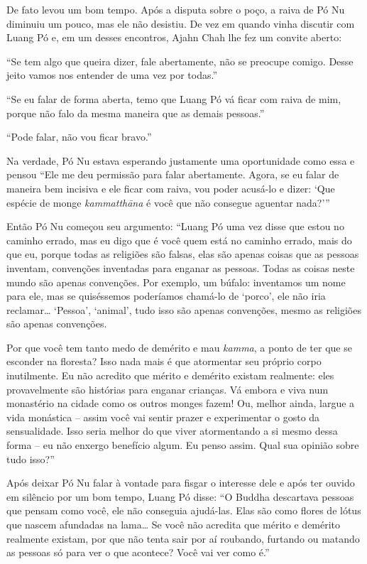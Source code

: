 De fato levou um bom tempo. Após a disputa sobre o poço, a raiva de Pó
Nu diminuiu um pouco, mas ele não desistiu. De vez em quando vinha
discutir com Luang Pó e, em um desses encontros, Ajahn Chah lhe fez um
convite aberto:

``Se tem algo que queira dizer, fale abertamente, não se preocupe
comigo. Desse jeito vamos nos entender de uma vez por todas.''

``Se eu falar de forma aberta, temo que Luang Pó vá ficar com raiva de
mim, porque não falo da mesma maneira que as demais pessoas.''

``Pode falar, não vou ficar bravo.''

Na verdade, Pó Nu estava esperando justamente uma oportunidade como essa
e pensou ``Ele me deu permissão para falar abertamente. Agora, se eu
falar de maneira bem incisiva e ele ficar com raiva, vou poder acusá-lo
e dizer: `Que espécie de monge \emph{kammatthāna} é você que não
consegue aguentar nada?'''

Então Pó Nu começou seu argumento: ``Luang Pó uma vez disse que estou no
caminho errado, mas eu digo que é você quem está no caminho errado, mais
do que eu, porque todas as religiões são falsas, elas são apenas coisas
que as pessoas inventam, convenções inventadas para enganar as pessoas.
Todas as coisas neste mundo são apenas convenções. Por exemplo, um
búfalo: inventamos um nome para ele, mas se quiséssemos poderíamos
chamá-lo de `porco', ele não iria reclamar\ldots{} `Pessoa', `animal',
tudo isso são apenas convenções, mesmo as religiões são apenas
convenções.

Por que você tem tanto medo de demérito e mau \emph{kamma}, a ponto de
ter que se esconder na floresta? Isso nada mais é que atormentar seu
próprio corpo inutilmente. Eu não acredito que mérito e demérito existam
realmente: eles provavelmente são histórias para enganar crianças. Vá
embora e viva num monastério na cidade como os outros monges fazem! Ou,
melhor ainda, largue a vida monástica -- assim você vai sentir prazer e
experimentar o gosto da sensualidade. Isso seria melhor do que viver
atormentando a si mesmo dessa forma -- eu não enxergo benefício algum.
Eu penso assim. Qual sua opinião sobre tudo isso?''

Após deixar Pó Nu falar à vontade para fisgar o interesse dele e após
ter ouvido em silêncio por um bom tempo, Luang Pó disse: ``O Buddha
descartava pessoas que pensam como você, ele não conseguia ajudá-las.
Elas são como flores de lótus que nascem afundadas na lama\ldots{} Se
você não acredita que mérito e demérito realmente existam, por que não
tenta sair por aí roubando, furtando ou matando as pessoas só para ver o
que acontece? Você vai ver como é.''


